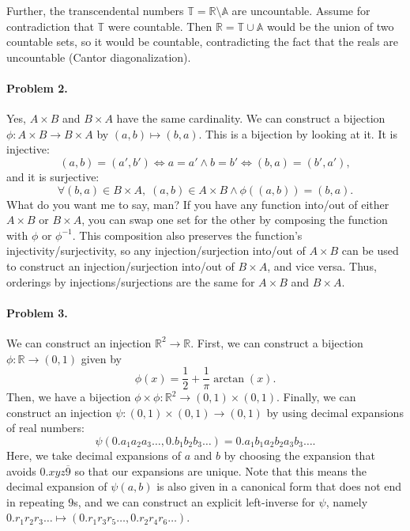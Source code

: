 \documentclass[12pt]{article}
\begin{document}
Further, the transcendental numbers $\mathbb T = \mathbb R \setminus \mathbb A$ are uncountable. Assume for contradiction that $\mathbb T$ were countable. Then $\mathbb R = \mathbb T \cup \mathbb A$ would be the union of two countable sets, so it would be countable, contradicting the fact that the reals are uncountable (Cantor diagonalization).

\paragraph{Problem 2.} Yes, $A \times B$ and $B \times A$ have the same cardinality. We can construct a bijection $\phi : A \times B \to B \times A$ by $(a, b) \mapsto (b, a)$. This is a bijection by looking at it. It is injective: 
\[ (a, b) = (a', b') \iff a = a' \land b = b' \iff (b, a) = (b', a'),\]
and it is surjective:
\[ \forall (b, a) \in B \times A, \; (a, b) \in A \times B \land  \phi((a, b)) = (b, a). \]
What do you want me to say, man? If you have any function into/out of either $A \times B$ or $B \times A$, you can swap one set for the other by composing the function with $\phi$ or $\phi^{-1}$. This composition also preserves the function's injectivity/surjectivity, so any injection/surjection into/out of $A \times B$ can be used to construct an injection/surjection into/out of $B \times A$, and vice versa. Thus, orderings by injections/surjections are the same for $A \times B$ and $B \times A$.

\paragraph{Problem 3.} We can construct an injection $\mathbb R^2 \to \mathbb R$. First, we can construct a bijection $\phi : \mathbb R \to (0, 1)$ given by \[\phi(x) = \frac{1}{2} + \frac{1}{\pi}\arctan(x).\] 
Then, we have a bijection $\phi \times \phi : \mathbb R^2 \to (0, 1) \times (0, 1)$. Finally, we can construct an injection $\psi : (0, 1) \times (0, 1) \to (0, 1)$ by using decimal expansions of real numbers:
\[\psi(0.a_1a_2a_3\dots, 0.b_1b_2b_3\dots) = 0.a_1b_1a_2b_2a_3b_3\dots.\]
Here, we take decimal expansions of $a$ and $b$ by choosing the expansion that avoids $0.xyz\overline{9}$ so that our expansions are unique. Note that this means the decimal expansion of $\psi(a, b)$ is also given in a canonical form that does not end in repeating $9$s, and we can construct an explicit left-inverse for $\psi$, namely $0.r_1 r_2 r_3 \dots \mapsto (0.r_1r_3r_5\dots, 0.r_2r_4r_6\dots)$.
\end{document}
